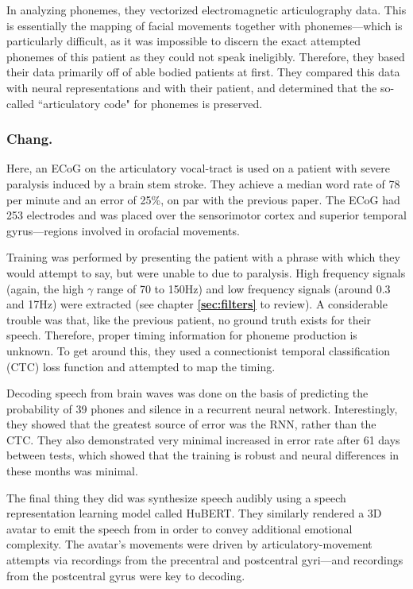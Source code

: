 In analyzing phonemes, they vectorized electromagnetic articulography data. This is essentially the mapping of facial movements together with phonemes---which is particularly difficult, as it was impossible to discern the exact attempted phonemes of this patient as they could not speak ineligibly. Therefore, they based their data primarily off of able bodied patients at first. They compared this data with neural representations and with their patient, and determined that the so-called ``articulatory code" for phonemes is preserved. 

\subsubsection{Chang.}

Here, an ECoG on the articulatory vocal-tract is used on a patient with severe paralysis induced by a brain stem stroke. They achieve a median word rate of 78 per minute and an error of 25\%, on par with the previous paper. The ECoG had 253 electrodes and was placed over the sensorimotor cortex and superior temporal gyrus---regions involved in orofacial movements.\newline 

Training was performed by presenting the patient with a phrase with which they would attempt to say, but were unable to due to paralysis. High frequency signals (again, the high $\gamma$ range of 70 to 150Hz) and low frequency signals (around 0.3 and 17Hz) were extracted (see chapter \textbf{\ref{sec:filters}} to review). A considerable trouble was that, like the previous patient, no ground truth exists for their speech. Therefore, proper timing information for phoneme production is unknown. To get around this, they used a connectionist temporal classification (CTC) loss function and attempted to map the timing.\newline

Decoding speech from brain waves was done on the basis of predicting the probability of 39 phones and silence in a recurrent neural network. Interestingly, they showed that the greatest source of error was the RNN, rather than the CTC. They also demonstrated very minimal increased in error rate after 61 days between tests, which showed that the training is robust and neural differences in these months was minimal. \newline

The final thing they did was synthesize speech audibly using a speech representation learning model called HuBERT. They similarly rendered a 3D avatar to emit the speech from in order to convey additional emotional complexity. The avatar's movements were driven by articulatory-movement attempts via recordings from the precentral and postcentral gyri---and recordings from the postcentral gyrus were key to decoding.\newline

